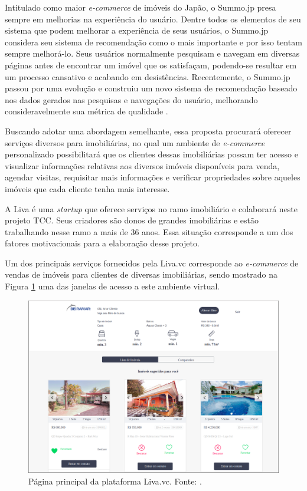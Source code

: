 Intitulado como maior \textit{e-commerce} de imóveis do Japão, o Summo.jp presa sempre em melhorias na experiência do usuário. Dentre todos os elementos de seu sistema que podem melhorar a experiência de seus usuários, o Summo.jp considera seu sistema de recomendação como o mais importante e por isso tentam sempre melhorá-lo. Seus usuários normalmente pesquisam e navegam em diversas páginas antes de encontrar um imóvel que os satisfaçam, podendo-se resultar em um processo cansativo e acabando em desistências. Recentemente, o Summo.jp passou por uma evolução e construiu um novo
sistema de recomendação baseado nos dados gerados nas pesquisas e navegações do usuário, melhorando consideravelmente sua métrica de qualidade \cite{Summo:2017}.

Buscando adotar uma abordagem semelhante, essa proposta procurará oferecer serviços diversos para imobiliárias, no qual um ambiente de \textit{e-commerce} personalizado possibilitará que os clientes dessas imobiliárias possam ter acesso e visualizar informações relativas aos diversos imóveis disponíveis para venda, agendar visitas, requisitar mais informações e verificar propriedades sobre aqueles imóveis que cada cliente tenha mais interesse.

A Liva é uma \textit{startup} que oferece serviços no ramo imobiliário e colaborará neste projeto TCC. Seus criadores são donos de grandes imobiliárias e estão trabalhando nesse ramo a mais de 36 anos. Essa situação corresponde a um dos fatores motivacionais para a elaboração desse projeto.

Um dos principais serviços fornecidos pela Liva.vc corresponde ao \textit{e-commerce} de vendas de imóveis para clientes de diversas imobiliárias, sendo mostrado na Figura \ref{fig:pagina_principal_liva} uma das janelas de acesso a este ambiente virtual.

\begin{figure}[H]
    \centering
    \includegraphics[scale=0.3]{figuras/introducao/pagina_principal_liva.png}
    \caption[Página principal da plataforma Liva.vc]{Página principal da plataforma Liva.vc. Fonte: \cite{Liva:2019}.}
    \label{fig:pagina_principal_liva}
\end{figure}


